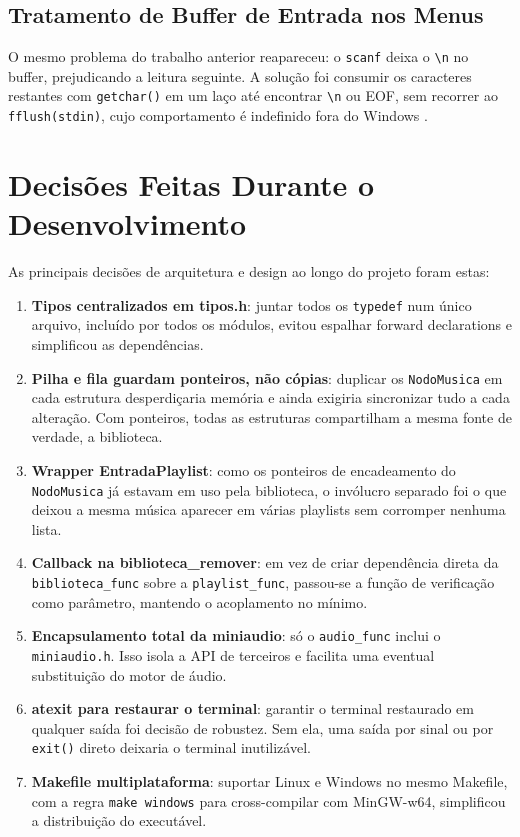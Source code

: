 \documentclass[
    12pt
    ,oneside
    ,a4paper
    ,chapter=TITLE
    ,section=TITLE
    ,sumario=abnt-6027-2012]{abntex2}
\begin{document}
\subsection{Tratamento de Buffer de Entrada nos Menus}

O mesmo problema do trabalho anterior reapareceu: o \texttt{scanf} deixa o \texttt{\textbackslash n} no buffer, prejudicando a leitura seguinte. A solução foi consumir os caracteres restantes com \texttt{getchar()} em um laço até encontrar \texttt{\textbackslash n} ou EOF, sem recorrer ao \texttt{fflush(stdin)}, cujo comportamento é indefinido fora do Windows \cite{cppreference_fflush}.

\section{Decisões Feitas Durante o Desenvolvimento}

As principais decisões de arquitetura e design ao longo do projeto foram estas:

\begin{enumerate}
    \item \textbf{Tipos centralizados em tipos.h}: juntar todos os \texttt{typedef} num único arquivo, incluído por todos os módulos, evitou espalhar forward declarations e simplificou as dependências.
    \item \textbf{Pilha e fila guardam ponteiros, não cópias}: duplicar os \texttt{NodoMusica} em cada estrutura desperdiçaria memória e ainda exigiria sincronizar tudo a cada alteração. Com ponteiros, todas as estruturas compartilham a mesma fonte de verdade, a biblioteca.
    \item \textbf{Wrapper EntradaPlaylist}: como os ponteiros de encadeamento do \texttt{NodoMusica} já estavam em uso pela biblioteca, o invólucro separado foi o que deixou a mesma música aparecer em várias playlists sem corromper nenhuma lista.
    \item \textbf{Callback na biblioteca\_remover}: em vez de criar dependência direta da \texttt{biblioteca\_func} sobre a \texttt{playlist\_func}, passou-se a função de verificação como parâmetro, mantendo o acoplamento no mínimo.
    \item \textbf{Encapsulamento total da miniaudio}: só o \texttt{audio\_func} inclui o \texttt{miniaudio.h}. Isso isola a API de terceiros e facilita uma eventual substituição do motor de áudio.
    \item \textbf{atexit para restaurar o terminal}: garantir o terminal restaurado em qualquer saída foi decisão de robustez. Sem ela, uma saída por sinal ou por \texttt{exit()} direto deixaria o terminal inutilizável.
    \item \textbf{Makefile multiplataforma}: suportar Linux e Windows no mesmo Makefile, com a regra \texttt{make windows} para cross-compilar com MinGW-w64, simplificou a distribuição do executável.
\end{enumerate}
\end{document}
